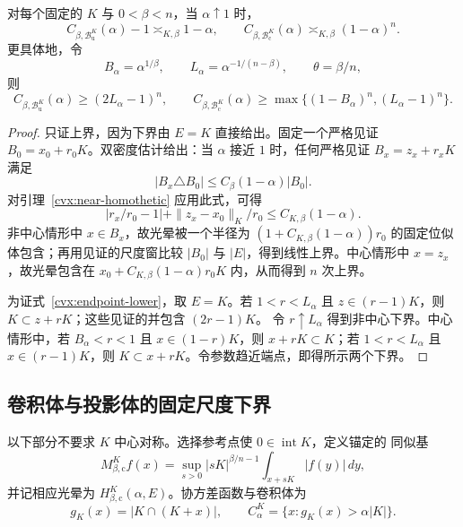 \begin{theorem}[固定中心对称凸体的端点阶]
\label{cvx:endpoint-order}
对每个固定的 $K$ 与 $0<\beta<n$，当 $\alpha\uparrow1$ 时，
\begin{equation}
 C_{\beta,\mathcal B^K_{\mathrm u}}(\alpha)-1\asymp_{K,\beta}1-\alpha,
 \qquad
 C_{\beta,\mathcal B^K_{\mathrm c}}(\alpha)
 \asymp_{K,\beta}(1-\alpha)^n.
 \label{cvx:endpoint-order-formula}
\end{equation}
更具体地，令
\[
 B_\alpha=\alpha^{1/\beta},\qquad
 L_\alpha=\alpha^{-1/(n-\beta)},\qquad\theta=\beta/n,
\]
则
\begin{equation}
 C_{\beta,\mathcal B^K_{\mathrm u}}(\alpha)\ge(2L_\alpha-1)^n,
 \qquad
 C_{\beta,\mathcal B^K_{\mathrm c}}(\alpha)
 \ge\max\{(1-B_\alpha)^n,(L_\alpha-1)^n\}.
 \label{cvx:endpoint-lower}
\end{equation}
\end{theorem}

\begin{proof}
只证上界，因为下界由 $E=K$ 直接给出。固定一个严格见证
$B_0=x_0+r_0K$。双密度估计给出：当 $\alpha$ 接近 $1$ 时，任何严格见证
$B_x=z_x+r_xK$ 满足
\[
 |B_x\triangle B_0|\le C_{\beta}(1-\alpha)|B_0|.
\]
对引理~\ref{cvx:near-homothetic} 应用此式，可得
\[
 |r_x/r_0-1|+\|z_x-x_0\|_K/r_0\le C_{K,\beta}(1-\alpha).
\]
非中心情形中 $x\in B_x$，故光晕被一个半径为
$(1+C_{K,\beta}(1-\alpha))r_0$ 的固定位似体包含；再用见证的尺度窗比较
$|B_0|$ 与 $|E|$，得到线性上界。中心情形中 $x=z_x$，故光晕包含在
$x_0+C_{K,\beta}(1-\alpha)r_0K$ 内，从而得到 $n$ 次上界。

为证式~\eqref{cvx:endpoint-lower}，取 $E=K$。若 $1<r<L_\alpha$ 且
$z\in(r-1)K$，则 $K\subset z+rK$；这些见证的并包含 $(2r-1)K$。
令 $r\uparrow L_\alpha$ 得到非中心下界。中心情形中，若 $B_\alpha<r<1$ 且
$x\in(1-r)K$，则 $x+rK\subset K$；若 $1<r<L_\alpha$ 且
$x\in(r-1)K$，则 $K\subset x+rK$。令参数趋近端点，即得所示两个下界。
\end{proof}

\subsection{卷积体与投影体的固定尺度下界}

以下部分不要求 $K$ 中心对称。选择参考点使 $0\in\operatorname{int}K$，定义锚定的
同似基
\[
 M^K_{\beta,\mathrm c}f(x)=\sup_{s>0}|sK|^{\beta/n-1}
 \int_{x+sK}|f(y)|\,dy,
\]
并记相应光晕为 $H^K_{\beta,\mathrm c}(\alpha,E)$。协方差函数与卷积体为
\[
 g_K(x)=|K\cap(K+x)|,
 \qquad C^K_\alpha=\{x:g_K(x)>\alpha|K|\}.
\]

